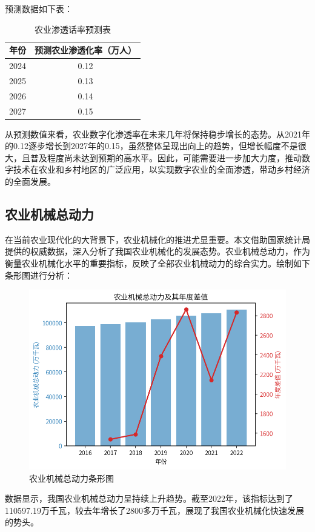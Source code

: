 预测数据如下表：
\begin{table}[H]
\caption{农业渗透话率预测表}
\centering
\begin{tabular}{cc}
\hline
\hline
\textbf{年份} &\textbf{预测农业渗透化率（万人）}\\
\hline
2024 & 0.12\\
2025 & 0.13\\
2026 & 0.14\\
2027 & 0.15\\
\hline
\end{tabular}
\end{table}

从预测数值来看，农业数字化渗透率在未来几年将保持稳步增长的态势。从2021年的0.12逐步增长到2027年的0.15，虽然整体呈现出向上的趋势，但增长幅度不是很大，且普及程度尚未达到预期的高水平。因此，可能需要进一步加大力度，推动数字技术在农业和乡村地区的广泛应用，以实现数字农业的全面渗透，带动乡村经济的全面发展。

\subsection{农业机械总动力}
在当前农业现代化的大背景下，农业机械化的推进尤显重要。本文借助国家统计局提供的权威数据，深入分析了我国农业机械化的发展态势。农业机械总动力，作为衡量农业机械化水平的重要指标，反映了全部农业机械动力的综合实力。绘制如下条形图进行分析：

\begin{figure}[H]
    \centering
    \includegraphics[width=0.6\linewidth]{figures/32.png}
    \caption{农业机械总动力条形图}
    \label{fig:agricultural_machinery_power}
\end{figure}

数据显示，我国农业机械总动力呈持续上升趋势。截至2022年，该指标达到了110597.19万千瓦，较去年增长了2800多万千瓦，展现了我国农业机械化快速发展的势头。

